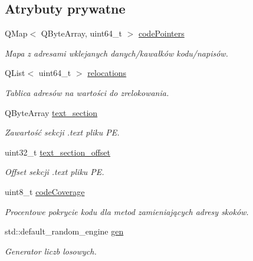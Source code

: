 \subsection*{Atrybuty prywatne}
\begin{DoxyCompactItemize}
\item 
Q\-Map$<$ Q\-Byte\-Array, uint64\-\_\-t $>$ \hyperlink{class_p_e_adding_methods_a82688d8dd0d6fac444e7b54ed6519600}{code\-Pointers}
\begin{DoxyCompactList}\small\item\em Mapa z adresami wklejanych danych/kawałków kodu/napisów. \end{DoxyCompactList}\item 
Q\-List$<$ uint64\-\_\-t $>$ \hyperlink{class_p_e_adding_methods_a52e354ff2cc785712a0a2fd91d1a550e}{relocations}
\begin{DoxyCompactList}\small\item\em Tablica adresów na wartości do zrelokowania. \end{DoxyCompactList}\item 
Q\-Byte\-Array \hyperlink{class_p_e_adding_methods_a3aeb84d0e21d2b26056ed9b934938692}{text\-\_\-section}
\begin{DoxyCompactList}\small\item\em Zawartość sekcji .text pliku P\-E. \end{DoxyCompactList}\item 
uint32\-\_\-t \hyperlink{class_p_e_adding_methods_a21614ff68440bb473986c1be1e93513b}{text\-\_\-section\-\_\-offset}
\begin{DoxyCompactList}\small\item\em Offset sekcji .text pliku P\-E. \end{DoxyCompactList}\item 
uint8\-\_\-t \hyperlink{class_p_e_adding_methods_af24025d4fc427613750acbca819978cd}{code\-Coverage}
\begin{DoxyCompactList}\small\item\em Procentowe pokrycie kodu dla metod zamieniających adresy skoków. \end{DoxyCompactList}\item 
std\-::default\-\_\-random\-\_\-engine \hyperlink{class_p_e_adding_methods_a43fe76ed7c6fc1345b85718c5d9a436a}{gen}
\begin{DoxyCompactList}\small\item\em Generator liczb losowych. \end{DoxyCompactList}\end{DoxyCompactItemize}
